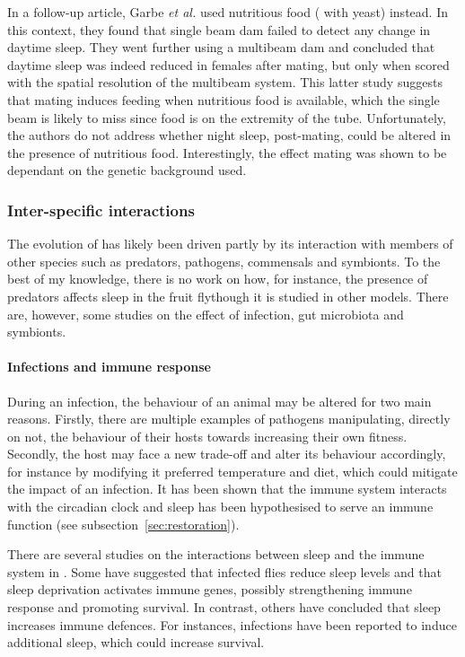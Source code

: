 In a follow-up article, Garbe \emph{et al.} used nutritious food (\ie{} with yeast) instead.
In this context, they found that single beam \gls{dam} failed to detect any change in daytime sleep.
They went further using a multibeam \gls{dam} and concluded that daytime sleep was indeed reduced in females after mating, but only when scored with the spatial resolution of the multibeam system.
This latter study suggests that mating induces feeding when nutritious food is available, which the single beam is likely to miss since food is on the extremity of the tube\cite{garbe_changes_2016}.
Unfortunately, the authors do not address whether night sleep, post-mating, could be altered in the presence of nutritious food.
Interestingly, the effect mating was shown to be dependant on the genetic background used\cite{zimmerman_genetic_2012}.

\subsubsection{Inter-specific interactions}
The evolution of \droso{} has likely been driven partly by its interaction with members of other species such as predators,
pathogens, commensals and symbionts.
To the best of my knowledge, there is no work on how, for instance, the presence of predators affects sleep in the fruit fly\emd{}though it is studied
in other models\cite{lima_sleeping_2005}.
There are, however, some studies on the effect of infection, gut microbiota and symbionts.

\paragraph*{Infections and immune response}
During an infection, the behaviour of an animal may be altered for two main reasons.
Firstly, there are multiple examples of pathogens manipulating, directly on not, the behaviour of their hosts towards increasing their own fitness\cite{van_houte_walking_2013}.
Secondly, the host may face a new trade-off and alter its behaviour accordingly, for instance by modifying it preferred temperature\cite{stahlschmidt_context_2013} and diet\cite{ayres_role_2009}, which could mitigate the impact of an infection.
It has been shown that the immune system interacts with the circadian clock\cite{shirasu-hiza_interactions_2007} and sleep has been hypothesised to serve an immune function (see subsection~\ref{sec:restoration}).

There are several studies on the interactions between sleep and the immune system in \droso.
Some have suggested that infected flies reduce sleep levels\cite{mallon_immune_2014} and that sleep deprivation activates immune genes\cite{cirelli_sleep_2005}, possibly strengthening immune response and promoting survival\cite{williams_interaction_2007,kuo_acute_2014}.
In contrast, others have concluded that sleep increases immune defences.
For instances, infections have been reported to induce additional sleep\cite{kuo_sleep_2010}, which could increase survival\cite{kuo_increased_2014}.

